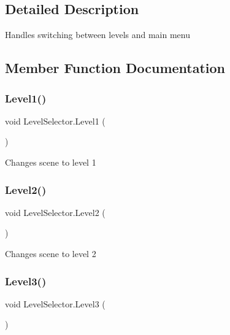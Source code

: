 \subsection{Detailed Description}
Handles switching between levels and main menu 

\subsection{Member Function Documentation}
\mbox{\label{class_level_selector_a9f5a0a4de4a6d9fbec81ed65cc0f7728}} 
\subsubsection{\texorpdfstring{Level1()}{Level1()}}
{\footnotesize\ttfamily void Level\+Selector.\+Level1 (\begin{DoxyParamCaption}{ }\end{DoxyParamCaption})\hspace{0.3cm}{\ttfamily [inline]}}

Changes scene to level 1 \mbox{\label{class_level_selector_adeb0b4be0958981b1a1a5a620361bc30}} 
\subsubsection{\texorpdfstring{Level2()}{Level2()}}
{\footnotesize\ttfamily void Level\+Selector.\+Level2 (\begin{DoxyParamCaption}{ }\end{DoxyParamCaption})\hspace{0.3cm}{\ttfamily [inline]}}

Changes scene to level 2 \mbox{\label{class_level_selector_a5dfc03a08d600ba73bdd2de47782d3d0}} 
\subsubsection{\texorpdfstring{Level3()}{Level3()}}
{\footnotesize\ttfamily void Level\+Selector.\+Level3 (\begin{DoxyParamCaption}{ }\end{DoxyParamCaption})\hspace{0.3cm}{\ttfamily [inline]}}


